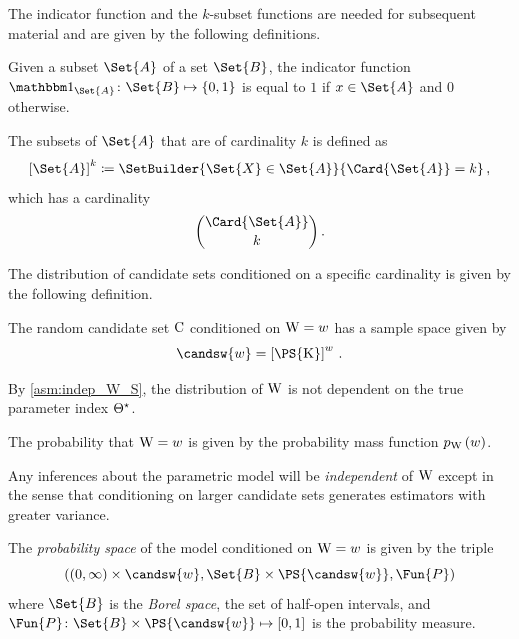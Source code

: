 \documentclass[../main.tex]{subfiles}
\begin{document}
The indicator function and the $k$-subset functions are needed for subsequent material and are given by the following definitions.
\begin{definition}
	Given a subset $\Set{A}$ of a set $\Set{B}$, the indicator function $\SetIndicator{\Set{A}} \colon \Set{B} \mapsto \{0,1\}$
	is equal to $1$ if $x \in \Set{A}$ and $0$ otherwise.
\end{definition}

\begin{definition}
	The subsets of $\Set{A}$ that are of cardinality $k$ is defined as
	\begin{equation}
	\left[\Set{A}\right]^k \coloneqq \SetBuilder{\Set{X} \in \Set{A}}{\Card{\Set{A}} = k}\,,
	\end{equation}
	which has a cardinality
	\begin{equation}
	\binom{\Card{\Set{A}}}{k}\,.
	\end{equation}
\end{definition}

The distribution of candidate sets conditioned on a specific cardinality is given by the following definition.
\begin{definition}
	The random candidate set $\mathrm{C}$ conditioned on $\mathrm{W} = w$ has a sample space given by
	\begin{equation}
	\candsw{w} = \left[\PS{\RV{K}}\right]^w\,.
	\end{equation}
\end{definition}
By \cref{asm:indep_W_S}, the distribution of $\mathrm{W}$ is not dependent on the true parameter index ${\Theta}^{\star}$.
\begin{definition}
\label{def:pmf_w}
	The probability that $\mathrm{W} = w$ is given by the probability mass function $p_{\mathrm{W}}\left(w\right)$.
\end{definition}
Any inferences about the parametric model will be \emph{independent} of $\mathrm{W}$ except in the sense that conditioning on larger candidate sets generates estimators with greater variance.

The \emph{probability space} of the model conditioned on $\mathrm{W} = w$ is given by the triple
\begin{equation}
	\left((0,\infty) \times \candsw{w}, \Set{B} \times \PS{\candsw{w}}, \Fun{P}\right)
\end{equation}
where $\Set{B}$ is the \emph{Borel space}, the set of half-open intervals, and $\Fun{P} \colon \Set{B} \times \PS{\candsw{w}} \mapsto [0,1]$ is the probability measure.
\end{document}
